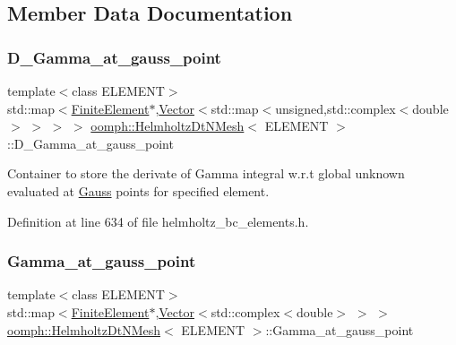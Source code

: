 \subsection{Member Data Documentation}
\mbox{\label{classoomph_1_1HelmholtzDtNMesh_a1a70bd5ef6e20837f7c9c0ce7abdd91b}} 
\subsubsection{\texorpdfstring{D\+\_\+\+Gamma\+\_\+at\+\_\+gauss\+\_\+point}{D\_Gamma\_at\_gauss\_point}}
{\footnotesize\ttfamily template$<$class E\+L\+E\+M\+E\+NT$>$ \\
std\+::map$<$\hyperlink{classoomph_1_1FiniteElement}{Finite\+Element}$\ast$,\hyperlink{classoomph_1_1Vector}{Vector}$<$std\+::map$<$unsigned,std\+::complex$<$double$>$ $>$ $>$ $>$ \hyperlink{classoomph_1_1HelmholtzDtNMesh}{oomph\+::\+Helmholtz\+Dt\+N\+Mesh}$<$ E\+L\+E\+M\+E\+NT $>$\+::D\+\_\+\+Gamma\+\_\+at\+\_\+gauss\+\_\+point\hspace{0.3cm}{\ttfamily [private]}}



Container to store the derivate of Gamma integral w.\+r.\+t global unknown evaluated at \hyperlink{classoomph_1_1Gauss}{Gauss} points for specified element. 



Definition at line 634 of file helmholtz\+\_\+bc\+\_\+elements.\+h.

\mbox{\label{classoomph_1_1HelmholtzDtNMesh_aacfbe2ef31d93e1071460f3b2bad2480}} 
\subsubsection{\texorpdfstring{Gamma\+\_\+at\+\_\+gauss\+\_\+point}{Gamma\_at\_gauss\_point}}
{\footnotesize\ttfamily template$<$class E\+L\+E\+M\+E\+NT$>$ \\
std\+::map$<$\hyperlink{classoomph_1_1FiniteElement}{Finite\+Element}$\ast$,\hyperlink{classoomph_1_1Vector}{Vector}$<$std\+::complex$<$double$>$ $>$ $>$ \hyperlink{classoomph_1_1HelmholtzDtNMesh}{oomph\+::\+Helmholtz\+Dt\+N\+Mesh}$<$ E\+L\+E\+M\+E\+NT $>$\+::Gamma\+\_\+at\+\_\+gauss\+\_\+point\hspace{0.3cm}{\ttfamily [private]}}



